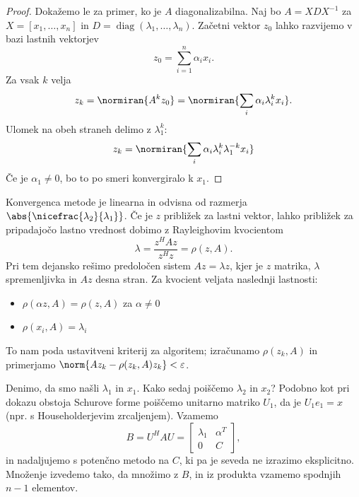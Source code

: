 \begin{proof}
  Dokažemo le za primer, ko je $A$ diagonalizabilna.
  Naj bo $A = X D X^{-1}$ za $X = [x_1, \ldots, x_n]$ in $D =
  \operatorname{diag}(\lambda_1, \ldots, \lambda_n)$.
  Začetni vektor $z_0$ lahko razvijemo v bazi lastnih vektorjev
  \[
	z_0 = \sum_{i=1}^n \alpha_i x_i.
  \]
  Za vsak $k$ velja
  \[
	z_k = \normiran{A^k z_0} = \normiran{\sum_i \alpha_i \lambda_i^k x_i}.
  \]
  Ulomek na obeh straneh delimo z $\lambda_1^k$:
  \[
	z_k = \normiran{\sum_i \alpha_i \lambda_i^k \lambda_1^{-k} x_i}
  \]
  Če je $\alpha_1 \ne 0$, bo to po smeri konvergiralo k $x_1$.
\end{proof}


Konvergenca metode je linearna in odvisna od razmerja
$\abs{\nicefrac{\lambda_2}{\lambda_1}}$.
Če je $z$ približek za lastni vektor, lahko približek za pripadajočo lastno
vrednost dobimo z Rayleighovim kvocientom
\[
  \lambda = \frac{z^H A z}{z^H z} = \rho(z, A).
\]
Pri tem dejansko rešimo predoločen sistem $Az = \lambda z$, kjer je $z$ matrika,
$\lambda$ spremenljivka in $Az$ desna stran.
Za kvocient veljata naslednji lastnosti:
\begin{itemize}
\item $\rho(\alpha z, A) = \rho(z, A)$ za $\alpha \ne 0$
\item $\rho(x_i, A) = \lambda_i$
\end{itemize}
To nam poda ustavitveni kriterij za algoritem; izračunamo $\rho(z_k, A)$ in
primerjamo $\norm{Az_k - \rho(z_k, A) z_k} < \varepsilon$.


Denimo, da smo našli $\lambda_1$ in $x_1$.
Kako sedaj poiščemo $\lambda_2$ in $x_2$?
Podobno kot pri dokazu obstoja Schurove forme poiščemo unitarno matriko $U_1$,
da je $U_1 e_1 = x$ (npr. s Householderjevim zrcaljenjem).
Vzamemo
\[
  B = U^H A U =
  \begin{bmatrix}
	\lambda_1 & \alpha^T \\ 0 & C
  \end{bmatrix},
\]
in nadaljujemo s potenčno metodo na $C$, ki pa je seveda ne izrazimo
eksplicitno.
Množenje izvedemo tako, da množimo z $B$, in iz produkta vzamemo spodnjih $n-1$
elementov.




